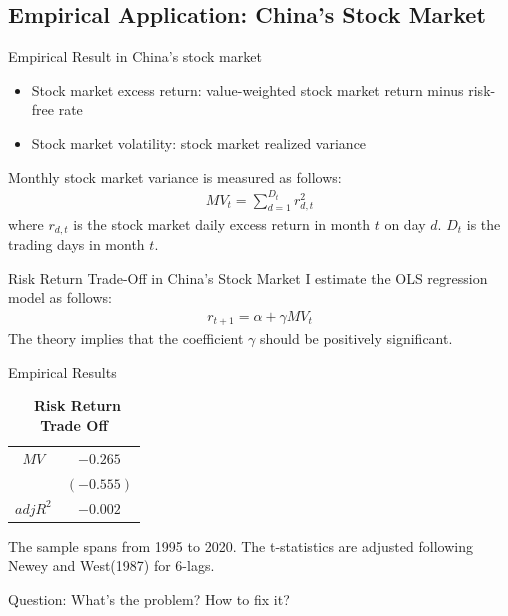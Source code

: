 \documentclass{beamer}
\begin{document}
\subsection{Empirical Application: China's Stock Market}

\begin{frame}{Empirical Result in China's stock market}
	\begin{itemize}
		\item Stock market excess return: value-weighted stock market return minus risk-free rate
		\item Stock market volatility: stock market realized variance
	\end{itemize}

	Monthly stock market variance is measured as follows:
	\begin{align*}
		MV_{t} =\sum_{d=1}^{D_{t}}r_{d,t}^{2}
	\end{align*}
	where $ r_{d,t} $ is  the stock market daily excess return in month $t$ on day $d$. $ D_{t} $ is the trading days in month $t$.
\end{frame}



\begin{frame}{Risk Return Trade-Off in China's Stock Market}
	I estimate the OLS regression model as follows:
	\begin{align*}
		r_{t+1} = \alpha + \gamma MV_{t}
	\end{align*}
	The theory implies that the coefficient $\gamma$ should be positively significant.
\end{frame}

\begin{frame}{Empirical Results}
	\begin{table}[!htbp]
		\centering
		\caption{\ \textbf{Risk Return Trade Off}}
		\begin{tabular}{cc}
			\hline
			$ MV $&$ -0.265 $\\
			& $ (-0.555) $\\
			$ adj R^2 $& $ -0.002 $ \\
			\hline
		\end{tabular}
	\end{table}
	The sample spans from 1995 to 2020. The t-statistics are adjusted following Newey and West(1987) for 6-lags.

	\vspace{10pt}
	Question: What's the problem? How to fix it?
\end{frame}
\end{document}
